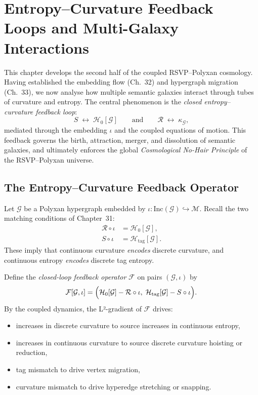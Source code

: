 \chapter{Entropy--Curvature Feedback Loops and Multi-Galaxy Interactions}
\label{ch:entropy-curvature-feedback}

\noindent
This chapter develops the second half of the coupled RSVP--Polyxan cosmology.  
Having established the embedding flow (Ch.~32) and hypergraph migration (Ch.~33), we now analyse how multiple semantic galaxies interact through tubes of curvature and entropy.  
The central phenomenon is the \emph{closed entropy--curvature feedback loop}:
\[
S \;\longleftrightarrow\; \mathcal{H}_0[\mathcal{G}] 
\qquad\text{and}\qquad
\mathcal{R} \;\longleftrightarrow\; \kappa_{\mathcal{G}},
\]
mediated through the embedding $\iota$ and the coupled equations of motion.  
This feedback governs the birth, attraction, merger, and dissolution of semantic galaxies, and ultimately enforces the global \emph{Cosmological No-Hair Principle} of the RSVP--Polyxan universe.

\section{The Entropy--Curvature Feedback Operator}
\label{sec:feedback-operator}

Let $\mathcal{G}$ be a Polyxan hypergraph embedded by $\iota : \mathrm{Inc}(\mathcal{G}) \hookrightarrow \mathcal{M}$.  
Recall the two matching conditions of Chapter~31:
\begin{align}
\mathcal{R}\circ\iota &= \mathcal{H}_0[\mathcal{G}], \label{eq:curvature-matching}\\
S\circ\iota &= \mathcal{H}_{\mathrm{tag}}[\mathcal{G}]. \label{eq:entropy-matching}
\end{align}
These imply that continuous curvature \emph{encodes} discrete curvature, and continuous entropy \emph{encodes} discrete tag entropy.

Define the \emph{closed-loop feedback operator} $\mathcal{F}$ on pairs $(\mathcal{G},\iota)$ by
\begin{equation}
\mathcal{F}[\mathcal{G},\iota]
  = \Bigl(
      \mathcal{H}_0[\mathcal{G}] - \mathcal{R}\circ\iota,\;
      \mathcal{H}_{\mathrm{tag}}[\mathcal{G}] - S\circ\iota
    \Bigr).
\end{equation}
By the coupled dynamics, the L²-gradient of $\mathcal{F}$ drives:
\begin{itemize}
\item increases in discrete curvature to source increases in continuous entropy,  
\item increases in continuous curvature to source discrete curvature hoisting or reduction,  
\item tag mismatch to drive vertex migration,  
\item curvature mismatch to drive hyperedge stretching or snapping.
\end{itemize}

